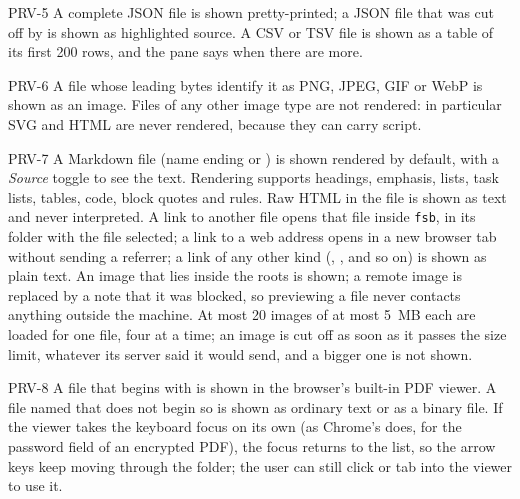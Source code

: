 \begin{req}{PRV-5}
A complete JSON file is shown pretty-printed; a JSON file that was cut off by
 is shown as highlighted source.  A CSV or TSV file is shown as a table of
its first 200 rows, and the pane says when there are more.
\end{req}

\begin{req}{PRV-6}
A file whose leading bytes identify it as PNG, JPEG, GIF or WebP is shown as an
image.  Files of any other image type are not rendered: in particular SVG and HTML are
never rendered, because they can carry script.
\end{req}

\begin{req}{PRV-7}
A Markdown file (name ending  or ) is shown rendered by
default, with a \emph{Source} toggle to see the text.  Rendering supports headings,
emphasis, lists, task lists, tables, code, block quotes and rules.  Raw HTML in the
file is shown as text and never interpreted.  A link to another file opens that file
inside \texttt{fsb}, in its folder with the file selected; a link to a web address
opens in a new browser tab without sending a referrer; a link of any other kind
(, ,  and so on) is shown as plain text.  An
image that lies inside the roots is shown; a remote image is replaced by a note that
it was blocked, so previewing a file never contacts anything outside the machine.  At
most 20 images of at most 5~MB each are loaded for one file, four at a time; an
image is cut off as soon as it passes the size limit, whatever its server said it
would send, and a bigger one is not shown.
\end{req}

\begin{req}{PRV-8}
A file that begins with  is shown in the browser's built-in PDF viewer.
A file named  that does not begin so is shown as ordinary text or as a
binary file.  If the viewer takes the keyboard focus on its own (as Chrome's does, for
the password field of an encrypted PDF), the focus returns to the list, so the arrow
keys keep moving through the folder; the user can still click or tab into the viewer
to use it.
\end{req}

